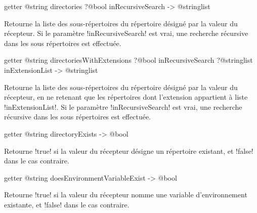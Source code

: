 
\begin{galgas3box}
getter @string directories ?@bool inRecursiveSearch -> @stringlist
\end{galgas3box}

Retourne la liste des sous-répertoires du répertoire désigné par la valeur du récepteur. Si le paramètre \ggst!inRecursiveSearch! est vrai, une recherche récursive dans les sous répertoires est effectuée.










\begin{galgas3box}
getter @string directoriesWithExtensions
    ?@bool inRecursiveSearch
    ?@stringlist inExtensionList -> @stringlist
\end{galgas3box}

Retourne la liste des sous-répertoires du répertoire désigné par la valeur du récepteur, en ne retenant que les répertoires dont l'extension appartient à liste \ggst!inExtensionList!. Si le paramètre \ggst!inRecursiveSearch! est vrai, une recherche récursive dans les sous répertoires est effectuée.









\begin{galgas3box}
getter @string directoryExists -> @bool
\end{galgas3box}

Retourne \ggst!true! si la valeur du récepteur désigne un répertoire existant, et \ggst!false! dans le cas contraire.









\begin{galgas3box}
getter @string doesEnvironmentVariableExist -> @bool
\end{galgas3box}

Retourne \ggst!true! si la valeur du récepteur nomme une variable d'environnement existante, et \ggst!false! dans le cas contraire.








